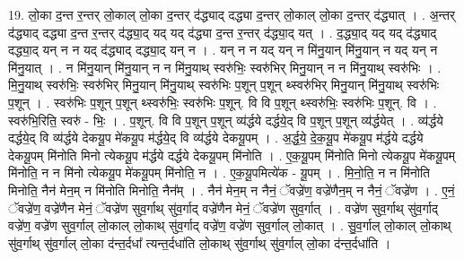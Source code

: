 \documentclass[17pt]{extarticle}
\begin{document}
19. लो॒का द॒न्त र॒न्तर् लो॒काल् लो॒का द॒न्तर् द॑द्ध्याद् दद्ध्या द॒न्तर् लो॒काल् लो॒का द॒न्तर् द॑द्ध्यात् । . अ॒न्तर् द॑द्ध्याद् दद्ध्या द॒न्त र॒न्तर् द॑द्ध्या॒द् यद् यद् द॑द्ध्या द॒न्त र॒न्तर् द॑द्ध्या॒द् यत् । . द॒द्ध्या॒द् यद् यद् द॑द्ध्याद् दद्ध्या॒द् यन् न न यद् द॑द्ध्याद् दद्ध्या॒द् यन् न । . यन् न न यद् यन् न मि॑नु॒यान् मि॑नु॒यान् न यद् यन् न मि॑नु॒यात् । . न मि॑नु॒यान् मि॑नु॒यान् न न मि॑नु॒याथ् स्वरु॑भिः॒ स्वरु॑भिर् मिनु॒यान् न न मि॑नु॒याथ् स्वरु॑भिः । . मि॒नु॒याथ् स्वरु॑भिः॒ स्वरु॑भिर् मिनु॒यान् मि॑नु॒याथ् स्वरु॑भिः प॒शून् प॒शून् थ्स्वरु॑भिर् मिनु॒यान् मि॑नु॒याथ् स्वरु॑भिः प॒शून् । . स्वरु॑भिः प॒शून् प॒शून् थ्स्वरु॑भिः॒ स्वरु॑भिः प॒शून्. वि वि प॒शून् थ्स्वरु॑भिः॒ स्वरु॑भिः प॒शून्. वि । . स्वरु॑भि॒रिति॒ स्वरु॑ - भिः॒ । . प॒शून्. वि वि प॒शून् प॒शून् व्य॑र्द्धये दर्द्धये॒द् वि प॒शून् प॒शून् व्य॑र्द्धयेत् । . व्य॑र्द्धये दर्द्धये॒द् वि व्य॑र्द्धये देकयू॒प मे॑कयू॒प म॑र्द्धये॒द् वि व्य॑र्द्धये देकयू॒पम् । . अ॒र्द्ध॒ये॒ दे॒क॒यू॒प मे॑कयू॒प म॑र्द्धये दर्द्धये देकयू॒पम् मि॑नोति मिनो त्येकयू॒प म॑र्द्धये दर्द्धये देकयू॒पम् मि॑नोति । . ए॒क॒यू॒पम् मि॑नोति मिनो त्येकयू॒प मे॑कयू॒पम् मि॑नोति॒ न न मि॑नो त्येकयू॒प मे॑कयू॒पम् मि॑नोति॒ न । . ए॒क॒यू॒पमित्ये॑क - यू॒पम् । . मि॒नो॒ति॒ न न मि॑नोति मिनोति॒ नैन॑ मेन॒म् न मि॑नोति मिनोति॒ नैन᳚म् । . नैन॑ मेन॒म् न नैनं॒ ॅवज्रे॑ण॒ वज्रे॑णैन॒म् न नैनं॒ ॅवज्रे॑ण । . ए॒नं॒ ॅवज्रे॑ण॒ वज्रे॑णैन मेनं॒ ॅवज्रे॑ण सुव॒र्गाथ् सु॑व॒र्गाद् वज्रे॑णैन मेनं॒ ॅवज्रे॑ण सुव॒र्गात् । . वज्रे॑ण सुव॒र्गाथ् सु॑व॒र्गाद् वज्रे॑ण॒ वज्रे॑ण सुव॒र्गाल् लो॒काल् लो॒काथ् सु॑व॒र्गाद् वज्रे॑ण॒ वज्रे॑ण सुव॒र्गाल् लो॒कात् । . सु॒व॒र्गाल् लो॒काल् लो॒काथ् सु॑व॒र्गाथ् सु॑व॒र्गाल् लो॒का द॑न्त॒र्दधा᳚ त्यन्त॒र्दधा॑ति लो॒काथ् सु॑व॒र्गाथ् सु॑व॒र्गाल् लो॒का द॑न्त॒र्दधा॑ति । \newline
\end{document}
